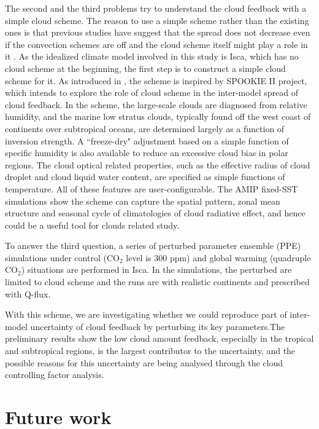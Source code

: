 The second and the third problems try to understand the cloud feedback with a simple cloud scheme. The reason to use a simple scheme rather than the existing ones is that previous studies have suggest that the spread does not decrease even if the convection schemes are off \citep{Webb2015} and the cloud scheme itself might play a role in it \citep[e.g.,][]{Qu2014,Geoffroy2017}. As the idealized climate model involved in this study is Isca, which has no cloud scheme at the beginning, the first step is to construct a simple cloud scheme for it. As introduced in , the scheme \citep{Liu2021simcloud} is inspired by SPOOKIE II project, which intends to explore the role of cloud scheme in the inter-model spread of cloud feedback. In the scheme, the large-scale clouds are diagnosed from relative humidity, and the marine low stratus clouds, typically found off the west coast of continents over subtropical oceans, are determined largely as a function of inversion strength. A ``freeze-dry" adjustment based on a simple function of specific humidity is also available to reduce an excessive cloud bias in polar regions. The cloud optical related properties, such as the effective radius of cloud droplet and cloud liquid water content, are specified as simple functions of temperature. All of these features are user-configurable. The AMIP fixed-SST simulations show the scheme can capture the spatial pattern, zonal mean structure and seasonal cycle of climatologies of cloud radiative effect, and hence could be a useful tool for clouds related study. 

To answer the third question, a series of perturbed parameter ensemble (PPE) simulations under control (CO$_2$ level is 300 ppm) and global warming (quadruple CO$_2$) situations are performed in Isca. In the simulations, the perturbed  are limited to cloud scheme and the runs are with realistic continents and prescribed with Q-flux.

With this scheme, we are investigating whether we could reproduce part of inter-model uncertainty of cloud feedback by perturbing its key parameters.The preliminary results show the low cloud amount feedback, especially in the tropical and subtropical regions, is the largest contributor to the uncertainty, and the possible reasons for this uncertainty are being analysed through the cloud controlling factor analysis.

\section{Future work}

